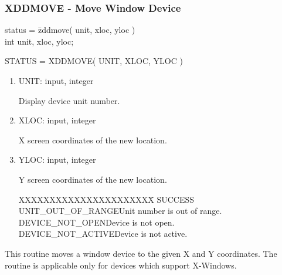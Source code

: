 \subsubsection{XDDMOVE - Move Window Device}
\begin{tabbing}
status = \=zddmove( unit, xloc, yloc )\\
\>int  unit, xloc, yloc;\\
\end{tabbing}
STATUS = XDDMOVE( UNIT, XLOC, YLOC )
\begin{enumerate}
\item UNIT:  input, integer

Display device unit number.
\item XLOC:  input, integer

X screen coordinates of the new location.
\item YLOC:  input, integer

Y screen coordinates of the new location.
\begin{tabbing}
XXXXXXXXXXXXXXXXXXXXXX\=\kill
SUCCESS\\
UNIT\_OUT\_OF\_RANGE\>Unit number is out of range.\\
DEVICE\_NOT\_OPEN\>Device is not open.\\
DEVICE\_NOT\_ACTIVE\>Device is not active.\\
\end{tabbing}
\end{enumerate}
This routine moves a window device to the given X and Y coordinates.  The
routine is applicable only for devices which support X-Windows.
\newpage
